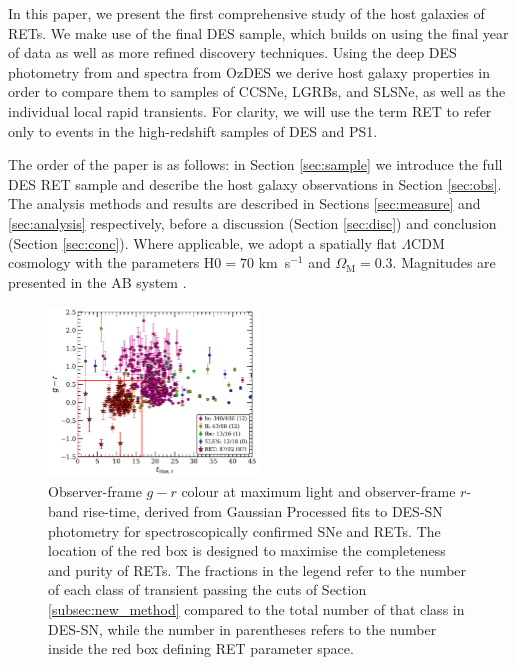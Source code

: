 \documentclass[fleqn,usenatbib,]{mnras}
\newcommand{\replychris}[1]{\color{magenta}#1 \color{black}}
\begin{document}
In this paper, we present the first comprehensive study of the host galaxies of RETs. We make use of the final DES sample, which builds on \citet{Pursiainen2018} using the final year of data as well as more refined discovery techniques. Using the deep DES photometry from \citet{Wiseman2020} and spectra from OzDES \citep{Lidman2020} we derive host galaxy properties in order to compare them to samples of CCSNe, LGRBs, and SLSNe, as well as the individual local rapid transients. For clarity, we will use the term RET to refer only to events in the high-redshift samples of DES and PS1. 

The order of the paper is as follows: \replychris{in Section \ref{sec:sample} we introduce the full DES RET sample and describe the host galaxy observations in Section \ref{sec:obs}. The analysis methods and results are described in Sections \ref{sec:measure} and \ref{sec:analysis} respectively, before a discussion (Section \ref{sec:disc}) and conclusion (Section \ref{sec:conc}).}
Where applicable, we adopt a spatially flat $\Lambda$CDM cosmology with the parameters H$0=70$ km~s$^{-1}$ and $\Omega_{\textrm{M}}=0.3$. Magnitudes are presented in the AB system \citep{Oke1983}.

\begin{figure}
\includegraphics[width=0.5\textwidth]{figs/spec_gr_trise_r_GP5_new_colorscheme.pdf}
\caption{Observer-frame $g-r$ colour \replychris{at maximum light} and \replychris{observer-frame} $r$-band rise-time, derived from Gaussian Processed fits to DES-SN photometry for spectroscopically confirmed SNe and  RETs. The location of the red box is designed to maximise the completeness and purity of RETs. \replychris{ The fractions in the legend refer to the number of each class of transient passing the cuts of Section \ref{subsec:new_method} compared to the total number of that class in DES-SN, while the number in parentheses refers to the number inside the red box defining RET parameter space. }
\label{fig:selection}}
\end{figure}
\end{document}
